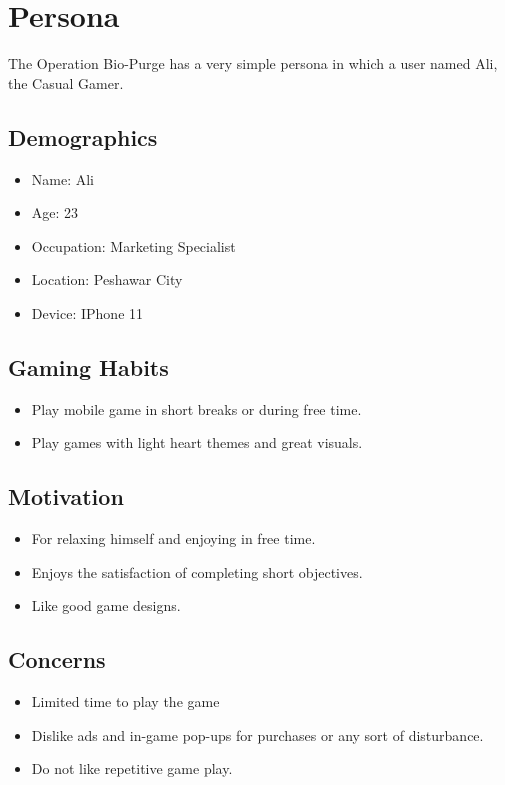 \section{Persona}
The Operation Bio-Purge has a very simple persona in which a user named Ali, the Casual Gamer.
\subsection{Demographics}
\begin{itemize}
	\item 	Name: Ali
	\item 	Age: 23
	\item 	Occupation: Marketing Specialist
	\item   Location: Peshawar City
	\item 	Device: IPhone 11
\end{itemize}
\subsection{Gaming Habits}
\begin{itemize}
	\item 	Play mobile game in short breaks or during free time.
	\item 	Play games with light heart themes and great visuals.
\end{itemize}
\subsection{Motivation}
\begin{itemize}
	\item For relaxing himself and enjoying in free time.
	\item 	Enjoys the satisfaction of completing short objectives.
	\item 	Like good game designs.
\end{itemize}
\subsection{Concerns}
\begin{itemize}
	\item 	Limited time to play the game
	\item	Dislike ads and in-game pop-ups for purchases or any sort of disturbance.
	\item	Do not like repetitive game play.
\end{itemize}


